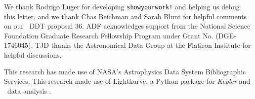\documentclass[twocolumn]{aastex631}
\begin{document}
\begin{acknowledgments}
We thank Rodrigo Luger for developing \texttt{showyourwork!} \citep{luger21} and helping us debug this letter, and we thank Chas Beichman and Sarah Blunt for helpful comments on our \tess\ DDT proposal 36. ADF acknowledges support from the National Science Foundation Graduate Research Fellowship Program under Grant No. (DGE-1746045). TJD thanks the Astronomical Data Group at the Flatiron Institute for helpful discussions. 

This research has made use of NASA's Astrophysics Data System Bibliographic Services. This research made use of Lightkurve, a Python package for \textit{Kepler} and \tess\ data analysis \citep{lightkurve}.

\end{acknowledgments}
\end{document}
